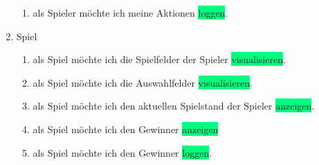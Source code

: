 \begin{enumerate}
\begin{enumerate}
		\item als \colorbox{Apricot}{Spieler} möchte ich meine Aktionen \colorbox{SpringGreen}{loggen}.
	\end{enumerate}
	\item Spiel
	\begin{enumerate}
		\item als \colorbox{Apricot}{Spiel} möchte ich die \colorbox{Apricot}{Spielfelder} der Spieler \colorbox{SpringGreen}{visualisieren}.
		\item als \colorbox{Apricot}{Spiel} möchte ich die \colorbox{Apricot}{Auswahlfelder} \colorbox{SpringGreen}{visualisieren}.
		\item als \colorbox{Apricot}{Spiel} möchte ich den aktuellen Spielstand der Spieler \colorbox{SpringGreen}{anzeigen}.
		\item als \colorbox{Apricot}{Spiel} möchte ich den \colorbox{Apricot}{Gewinner} \colorbox{SpringGreen}{anzeigen}
		\item als \colorbox{Apricot}{Spiel} möchte ich den \colorbox{Apricot}{Gewinner} \colorbox{SpringGreen}{loggen}.
	\end{enumerate}
\end{enumerate}